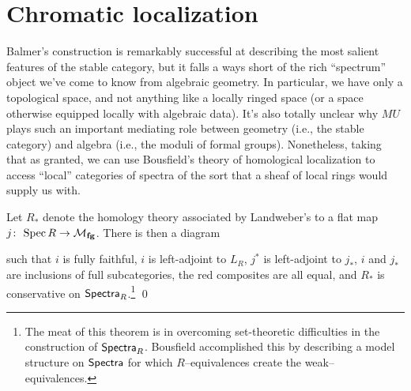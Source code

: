 \section{Chromatic localization}\label{ChromaticLocalizationSection}

Balmer's construction is remarkably successful at describing the most salient features of the stable category, but it falls a ways short of the rich ``spectrum'' object we've come to know from algebraic geometry.  In particular, we have only a topological space, and not anything like a locally ringed space (or a space otherwise equipped locally with algebraic data).  It's also totally unclear why $MU$ plays such an important mediating role between geometry (i.e., the stable category) and algebra (i.e., the moduli of formal groups).
Nonetheless, taking that as granted, we can use Bousfield's theory of homological localization to access ``local'' categories of spectra of the sort that a sheaf of local rings would supply us with.

\begin{theorem}
Let $R_*$ denote the homology theory associated by Landweber's  to a flat map $j\colon\thinspace \operatorname{Spec} R \to \mathcal{M}_{\mathbf{fg}}$.  There is then a diagram
\begin{center}
\end{center}
such that $i$ is fully faithful, $i$ is left-adjoint to $L_R$, $j^*$ is left-adjoint to $j_*$, $i$ and $j_*$ are inclusions of full subcategories, the red composites are all equal, and $R_*$ is conservative on $\mathsf{Spectra}_R$.\footnote{The meat of this theorem is in overcoming set-theoretic difficulties in the construction of $\mathsf{Spectra}_R$.  Bousfield accomplished this by describing a model structure on $\mathsf{Spectra}$ for which $R$--equivalences create the weak--equivalences.} \qed
\end{theorem}

